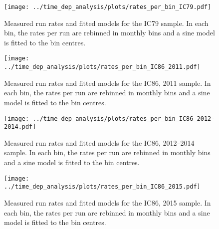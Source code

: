 \begin{figure}[H]
  \centering
  \texttt{[image: ../time\_dep\_analysis/plots/rates\_per\_bin\_IC79.pdf]}
  \caption[Rate models per bin for sample IC79]{
    Measured run rates and fitted models for the IC79 sample.
    In each bin, the rates per run are rebinned in monthly bins and a sine model is fitted to the bin centres.
  }
  \label{fig:rates_per_bin_IC79}
\end{figure}

\begin{figure}[H]
  \centering
  \texttt{[image: ../time\_dep\_analysis/plots/rates\_per\_bin\_IC86\_2011.pdf]}
  \caption[Rate models per bin for sample IC86, 2011]{
    Measured run rates and fitted models for the IC86, 2011 sample.
    In each bin, the rates per run are rebinned in monthly bins and a sine model is fitted to the bin centres.
  }
  \label{fig:rates_per_bin_IC86_2011}
\end{figure}

\begin{figure}[H]
  \centering
  \texttt{[image: ../time\_dep\_analysis/plots/rates\_per\_bin\_IC86\_2012-2014.pdf]}
  \caption[Rate models per bin for sample IC86, 2012--2014]{
    Measured run rates and fitted models for the IC86, 2012--2014 sample.
    In each bin, the rates per run are rebinned in monthly bins and a sine model is fitted to the bin centres.
  }
  \label{fig:rates_per_bin_IC86_2012-2014}
\end{figure}

\begin{figure}[H]
  \centering
  \texttt{[image: ../time\_dep\_analysis/plots/rates\_per\_bin\_IC86\_2015.pdf]}
  \caption[Rate models per bin for sample IC86, 2015]{
    Measured run rates and fitted models for the IC86, 2015 sample.
    In each bin, the rates per run are rebinned in monthly bins and a sine model is fitted to the bin centres.
  }
  \label{fig:rates_per_bin_IC86_2015}
\end{figure}

